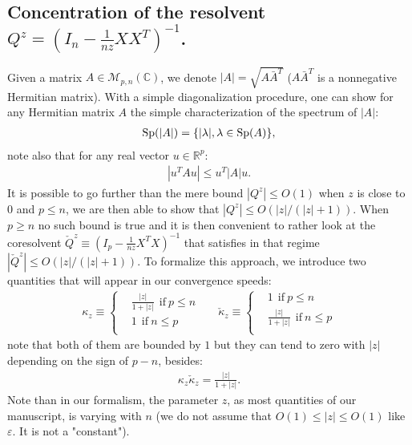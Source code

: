 \documentclass[a4papaer, titlepage]{book}
\begin{document}
\subsection{Concentration of the resolvent $Q^z = (I_n -\frac{1}{nz}XX^T)^{-1}$.}
   Given a matrix $A \in \mathcal M_{p,n}(\mathbb C)$, we denote $|A| = \sqrt{A\bar A^T}$ ($A\bar A^T$ is a nonnegative Hermitian matrix). With a simple diagonalization procedure, one can show for any Hermitian matrix $A$ the simple characterization of the spectrum of $|A|$:
\begin{align}\label{eq:valeur_propre_module_matrice}
   \operatorname{Sp}(|A|) = \{|\lambda|, \lambda\in \operatorname{Sp}(A)\},
 \end{align} 
 note also that for any real vector $u \in \mathbb R^p$:
 \begin{align}\label{eq:borne_module_formme_q}
   |u^T A u| \leq u^T |A|u.
 \end{align} 
  It is possible to go further than the mere bound $|Q^z| \leq O(1)$ when $z$ is close to $0$ and $p\leq n$, we are then able to show that $|Q^z| \leq O(|z|/(|z|+1))$. When $p \geq n$ no such bound is true and it is then convenient to rather look at the coresolvent $\check Q^z \equiv (I_p - \frac{1}{nz} X^TX)^{-1}$ that satisfies in that regime $|\check Q^z| \leq O(|z|/(|z|+1))$. 
To formalize this approach, we introduce two quantities that will appear in our convergence speeds:
\begin{align*}
  \kappa_z \equiv 
  \left\{\begin{aligned}
    &\frac{|z|}{1+|z|} \ \ \text{if} \ p \leq n\\
    &1 \ \ \text{if} \ n \leq p\\
  \end{aligned}\right.&
  & \check\kappa_z \equiv 
  \left\{\begin{aligned}
    &1 \ \ \text{if} \ p \leq n\\
    &\frac{|z|}{1+|z|} \ \ \text{if} \ n \leq p\\
  \end{aligned}\right.
\end{align*}
note that both of them are bounded by $1$ but they can tend to zero with $|z|$ depending on the sign of $p-n$, besides:
\begin{align}\label{eq:formulekxck}
  \kappa_z \check \kappa_z = \frac{|z|}{1+|z|}.
\end{align}
Note than in our formalism, the parameter $z$, as most quantities of our manuscript, is varying with $n$ (we do not assume that $O(1) \leq |z| \leq O(1)$ like $\varepsilon$. It is not a "constant").
\end{document}
